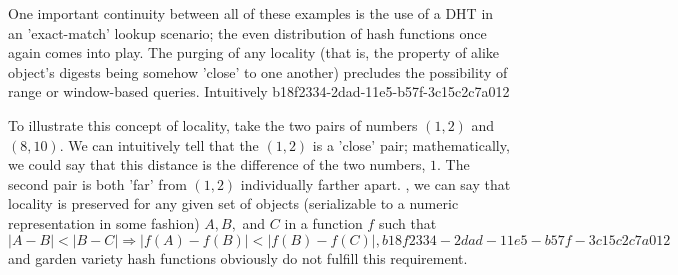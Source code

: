 \documentclass[12pt]{article}
\begin{document}
\par One important continuity between all of these examples is the use of a DHT in an 'exact-match' lookup scenario; the even distribution of hash functions once again comes into play. The purging of any locality (that is, the property of alike object's digests being somehow 'close' to one another) precludes the possibility of range or window-based queries. Intuitively
b18f2334-2dad-11e5-b57f-3c15c2c7a012
\par To illustrate this concept of locality, take the two pairs of numbers $(1,2)$ and $(8,10)$. We can intuitively tell that the $(1,2)$ is a 'close' pair; mathematically, we could say that this distance is the difference of the two numbers, $1$. The second pair is both 'far' from $(1,2)$ individually farther apart. , we can say that locality is preserved for any given set of objects (serializable to a numeric representation in some fashion) $A,B,$ and $C$ in a function $f$ such that
\begin{equation}
|A-B| < |B-C| \Rightarrow |f(A)-f(B)| < |f(B) - f(C)|,
b18f2334-2dad-11e5-b57f-3c15c2c7a012\end{equation}
and garden variety hash functions obviously do not fulfill this requirement.

\printbibliography
\end{document}
